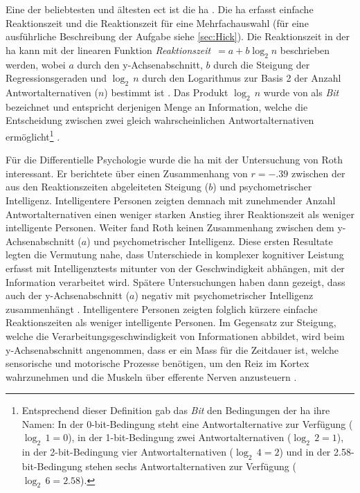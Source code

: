 \documentclass[11pt, twoside, a4paper]{book}		%
\begin{document}
Eine der beliebtesten und ältesten \gls{ect} ist die \gls{ha} \citep{Hick1952}.  Die \gls{ha} erfasst einfache Reaktionszeit und die Reaktionszeit für eine Mehrfachauswahl (für eine ausführliche Beschreibung der Aufgabe siehe \autoref{sec:Hick}). Die Reaktionszeit in der \gls{ha} kann mit der linearen Funktion \textit{Reaktionszeit}~$=a+b\log_{2}n$ beschrieben werden, wobei $a$ durch den y-Achsen\-ab\-schnitt, $b$ durch die Steigung der Regres\-sions\-geraden und $\log_{2}\,n$ durch den Logarithmus zur Basis 2 der Anzahl Antwortalternativen ($n$) bestimmt ist \citep[S. 105]{Jensen1987a}. Das Produkt $\log_{2}\,n$ wurde von \citet{Hick1952} als \textit{Bit} bezeichnet und entspricht derjenigen Menge an Information, welche die Entscheidung zwischen zwei gleich wahrscheinlichen Antwortalternativen ermöglicht\footnote{Entsprechend dieser Definition gab das \textit{Bit} den Bedingungen der \gls{ha} ihre Namen: In der 0-bit-Bedingung steht eine Antwortalternative zur Verfügung ($\log_{2}\,1=0$), in der 1-bit-Bedingung zwei Antwortalternativen ($\log_{2}\,2=1$), in der 2-bit-Bedingung vier Antwortalternativen ($\log_{2}\,4=2$) und in der 2.58-bit-Bedingung stehen sechs Antwortalternativen zur Verfügung ($\log_{2}\,6=2.58$).} \citep[siehe auch][S. 27]{Jensen2006}.

Für die Differentielle Psychologie wurde die \gls{ha} mit der Untersuchung von Roth \citep[1964; zitiert nach][S. 105]{Jensen1987a} interessant. Er berichtete über einen Zusammenhang von $r=-.39$ zwischen der aus den Reaktionszeiten abgeleiteten Steigung ($b$) und psychometrischer Intelligenz. Intelligentere Personen zeigten demnach mit zunehmender Anzahl Antwortalternativen einen weniger starken Anstieg ihrer Reaktionszeit als weniger intelligente Personen. Weiter fand Roth keinen Zusammenhang zwischen dem y-Ach\-sen\-ab\-schnitt ($a$) und psychometrischer Intelligenz. Diese ersten Resultate legten die Vermutung nahe, dass Unterschiede in komplexer kognitiver Leistung erfasst mit Intelligenztests mitunter von der Geschwindigkeit abhängen, mit der Information verarbeitet wird.
Spätere Untersuchungen haben dann gezeigt, dass auch der y-Ach\-sen\-ab\-schnitt ($a$) negativ mit psychometrischer Intelligenz zusammenhängt \citep{Jensen1982b, Jensen1987a, Neubauer1997a, Neubauer1997b}. Intelligentere Personen zeigten folglich kürzere einfache Reaktionszeiten als weniger intelligente Personen. Im Gegensatz zur Steigung, welche die Verarbeitungsgeschwindigkeit von Informationen abbildet, wird beim y-Ach\-sen\-ab\-schnitt angenommen, dass er ein Mass für die Zeitdauer ist, welche sensorische und motorische Prozesse benötigen, um den Reiz im Kortex wahrzunehmen und die Muskeln über efferente Nerven anzusteuern \citep{Jensen1998a}.
\end{document}
